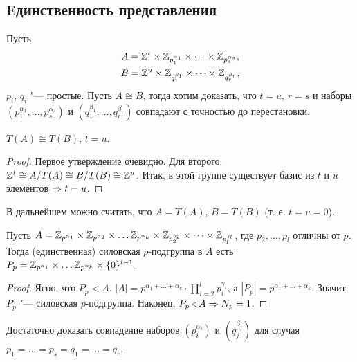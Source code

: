 \documentclass[main]{subfiles}
\begin{document}
\subsection{Единственность представления}
Пусть
\begin{gather}
  A = \mathbb{Z}^t \times \mathbb{Z}_{p_1^{\alpha_1}} \times
  \dots \times \mathbb{Z}_{p_s^{\alpha_s}} , \\
  B = \mathbb{Z}^u \times \mathbb{Z}_{q_1^{\beta_1}} \times
  \dots \times \mathbb{Z}_{q_r^{\beta_r}},
\end{gather}
\( p_i \), \( q_i \) "---
простые.
Пусть \( A \cong B \), тогда хотим доказать,
что \( t = u \), \( r = s \) и наборы
\( (p_1^{\alpha_1}, \dots, p_s^{\alpha_s}) \) и
\( (q_1^{\beta_1}, \dots, q_r^{\beta_r}) \) совпадают
с точностью до перестановки.

\begin{corollary}
  \( T(A) \cong T(B) \), \( t = u \).
\end{corollary}
\begin{proof}
  Первое утверждение очевидно. Для второго:
  \( \Integer^t \cong \Factor{A}[T(A)] \cong
  \Factor{B}[T(B)] \cong \Integer^u \).
  Итак, в этой группе существует базис из
  \( t \) и \( u \) элементов \( \Rightarrow t = u \).
\end{proof}

В дальнейшем можно считать, что \( A = T(A) \),
\( B = T(B) \) (т. е. \( t = u = 0 \)).

\begin{proposition}
  Пусть \( A = \mathbb{Z}_{p^{\alpha_1}} \times
  \mathbb{Z}_{p^{\alpha_2}} \times
  \dots 
  \mathbb{Z}_{p^{\alpha_k}} \times
  \mathbb{Z}_{p_2^{\gamma_2}} \times
  \dots \times \mathbb{Z}_{p_l^{\gamma_l}} \),
  где \( p_2, \dots, p_l \) отличны от \( p \).
  Тогда (единственная) силовская \( p \)-подгруппа
  в \( A \) есть \( P_p = \mathbb{Z}_{p^{\alpha_1}} \times
  \dots \mathbb{Z}_{p^{\alpha_k}} \times \{ 0 \}^{l-1} \).
\end{proposition}
\begin{proof}
  Ясно, что \( P_p < A \). \( |A| = p^{\alpha_1 + \dots + \alpha_k}
  \cdot \prod_{i = 2}^l p_i^{\gamma_i} \), а
  \( |P_p| = p^{\alpha_1 + \dots + \alpha_k} \).
  Значит, \( P_p \) "--- силовская \( p \)-подгруппа.
  Наконец, \( P_p \triangleleft A \Rightarrow N_p = 1 \).
\end{proof}
\begin{corollary}
  Достаточно доказать совпадение наборов
  \( (p_i^{\alpha_i}) \) и \( (q_j^{\beta_j}) \)
  для случая \( p_1 = \dots = p_s = q_1 = \dots = q_r \).
\end{corollary}
\end{document}
